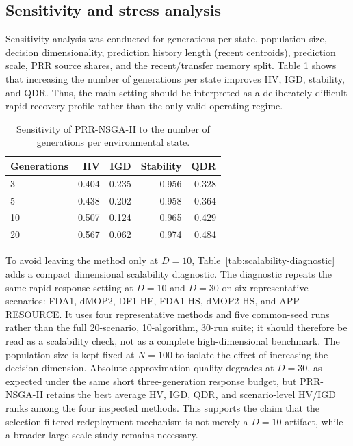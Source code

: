 \documentclass[1p,times]{elsarticle}
\begin{document}
\subsection{Sensitivity and stress analysis}
Sensitivity analysis was conducted for generations per state, population size, decision dimensionality, prediction history length (recent centroids), prediction scale, PRR source shares, and the recent/transfer memory split. Table \ref{tab:sens-generations} shows that increasing the number of generations per state improves HV, IGD, stability, and QDR. Thus, the main setting should be interpreted as a deliberately difficult rapid-recovery profile rather than the only valid operating regime.

\begin{table}[htbp]
\centering
\caption{Sensitivity of PRR-NSGA-II to the number of generations per environmental state.}
\label{tab:sens-generations}
\begin{tabular}{lrrrr}
\toprule
Generations & HV & IGD & Stability & QDR \\
\midrule
3 & 0.404 & 0.235 & 0.956 & 0.328 \\
5 & 0.438 & 0.202 & 0.958 & 0.364 \\
10 & 0.507 & 0.124 & 0.965 & 0.429 \\
20 & 0.567 & 0.062 & 0.974 & 0.484 \\
\bottomrule
\end{tabular}
\end{table}

To avoid leaving the method only at $D=10$, Table~\ref{tab:scalability-diagnostic} adds a compact dimensional scalability diagnostic. The diagnostic repeats the same rapid-response setting at $D=10$ and $D=30$ on six representative scenarios: FDA1, dMOP2, DF1-HF, FDA1-HS, dMOP2-HS, and APP-RESOURCE. It uses four representative methods and five common-seed runs rather than the full 20-scenario, 10-algorithm, 30-run suite; it should therefore be read as a scalability check, not as a complete high-dimensional benchmark. The population size is kept fixed at $N=100$ to isolate the effect of increasing the decision dimension. Absolute approximation quality degrades at $D=30$, as expected under the same short three-generation response budget, but PRR-NSGA-II retains the best average HV, IGD, QDR, and scenario-level HV/IGD ranks among the four inspected methods. This supports the claim that the selection-filtered redeployment mechanism is not merely a $D=10$ artifact, while a broader large-scale study remains necessary.
\end{document}
